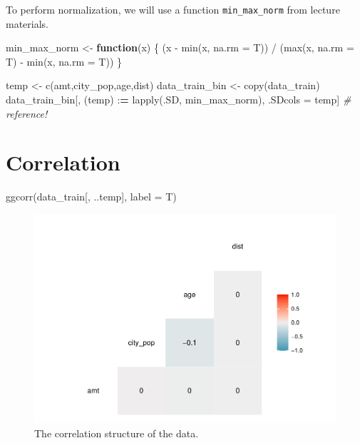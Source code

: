 \documentclass[
]{report}
\newenvironment{Shaded}{\begin{snugshade}}{\end{snugshade}}
\newcommand{\AttributeTok}[1]{\textcolor[rgb]{0.77,0.63,0.00}{#1}}
\newcommand{\CommentTok}[1]{\textcolor[rgb]{0.56,0.35,0.01}{\textit{#1}}}
\newcommand{\ControlFlowTok}[1]{\textcolor[rgb]{0.13,0.29,0.53}{\textbf{#1}}}
\newcommand{\ErrorTok}[1]{\textcolor[rgb]{0.64,0.00,0.00}{\textbf{#1}}}
\newcommand{\FunctionTok}[1]{\textcolor[rgb]{0.00,0.00,0.00}{#1}}
\newcommand{\NormalTok}[1]{#1}
\newcommand{\OtherTok}[1]{\textcolor[rgb]{0.56,0.35,0.01}{#1}}
\newcommand{\SpecialCharTok}[1]{\textcolor[rgb]{0.00,0.00,0.00}{#1}}
\newcommand{\StringTok}[1]{\textcolor[rgb]{0.31,0.60,0.02}{#1}}
\begin{document}
To perform normalization, we will use a function \texttt{min\_max\_norm}
from lecture materials.

\begin{Shaded}
\begin{Highlighting}[]
\NormalTok{min\_max\_norm }\OtherTok{\textless{}{-}} \ControlFlowTok{function}\NormalTok{(x) \{}
\NormalTok{  (x }\SpecialCharTok{{-}} \FunctionTok{min}\NormalTok{(x, }\AttributeTok{na.rm =}\NormalTok{ T)) }\SpecialCharTok{/}\NormalTok{ (}\FunctionTok{max}\NormalTok{(x, }\AttributeTok{na.rm =}\NormalTok{ T) }\SpecialCharTok{{-}} \FunctionTok{min}\NormalTok{(x, }\AttributeTok{na.rm =}\NormalTok{ T))}
\NormalTok{\}}

\NormalTok{temp }\OtherTok{\textless{}{-}} \FunctionTok{c}\NormalTok{(}\StringTok{\textquotesingle{}amt\textquotesingle{}}\NormalTok{,}\StringTok{\textquotesingle{}city\_pop\textquotesingle{}}\NormalTok{,}\StringTok{\textquotesingle{}age\textquotesingle{}}\NormalTok{,}\StringTok{\textquotesingle{}dist\textquotesingle{}}\NormalTok{)}
\NormalTok{data\_train\_bin }\OtherTok{\textless{}{-}} \FunctionTok{copy}\NormalTok{(data\_train)}
\NormalTok{data\_train\_bin[, (temp) }\SpecialCharTok{:}\ErrorTok{=} \FunctionTok{lapply}\NormalTok{(.SD, min\_max\_norm), .SDcols }\OtherTok{=}\NormalTok{ temp] }\CommentTok{\# reference!}
\end{Highlighting}
\end{Shaded}

\hypertarget{correlation}{%
\section{Correlation}\label{correlation}}

\begin{Shaded}
\begin{Highlighting}[]
\FunctionTok{ggcorr}\NormalTok{(data\_train[, ..temp], }\AttributeTok{label =}\NormalTok{ T)}
\end{Highlighting}
\end{Shaded}

\begin{figure}
\centering
\includegraphics{credit_card_fraud_detection_files/figure-latex/correlation-1.pdf}
\caption{\label{Fig:correlation}The correlation structure of the data.}
\end{figure}
\end{document}
